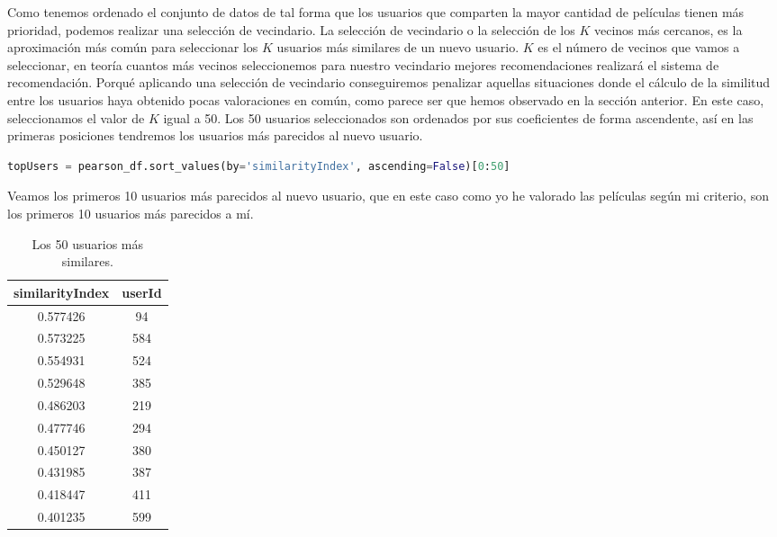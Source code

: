 \documentclass{uimppracticas}
\begin{document}
Como tenemos ordenado el conjunto de datos de tal forma que los usuarios que comparten la mayor cantidad de películas tienen más prioridad, podemos realizar una selección de vecindario. La selección de vecindario o la selección de los $K$ vecinos más cercanos, es la aproximación más común para seleccionar los $K$ usuarios más similares de un nuevo usuario. $K$ es el número de vecinos que vamos a seleccionar, en teoría cuantos más vecinos seleccionemos para nuestro vecindario mejores recomendaciones realizará el sistema de recomendación. Porqué aplicando una selección de vecindario conseguiremos penalizar aquellas situaciones donde el cálculo de la similitud entre los usuarios haya obtenido pocas valoraciones en común, como parece ser que hemos observado en la sección anterior. En este caso, seleccionamos el valor de $K$ igual a 50. Los 50 usuarios seleccionados son ordenados por sus coeficientes de forma ascendente, así en las primeras posiciones tendremos los usuarios más parecidos al nuevo usuario.

\begin{lstlisting}[language=python, basicstyle=\small]
topUsers = pearson_df.sort_values(by='similarityIndex', ascending=False)[0:50]
\end{lstlisting}

Veamos los primeros 10 usuarios más parecidos al nuevo usuario, que en este caso como yo he valorado las películas según mi criterio, son los primeros 10 usuarios más parecidos a mí.

\begin{table}[h]
	\centering
	\begin{tabular}{cc}
		\toprule
		similarityIndex &  userId \\
		\midrule
		0.577426 &      94 \\
		0.573225 &     584 \\
		0.554931 &     524 \\
		0.529648 &     385 \\
		0.486203 &     219 \\
		0.477746 &     294 \\
		0.450127 &     380 \\
		0.431985 &     387 \\
		0.418447 &     411 \\
		0.401235 &     599 \\
		\bottomrule
	\end{tabular}
	\caption{Los 50 usuarios más similares.}
	\label{top_50}
\end{table}
\end{document}
